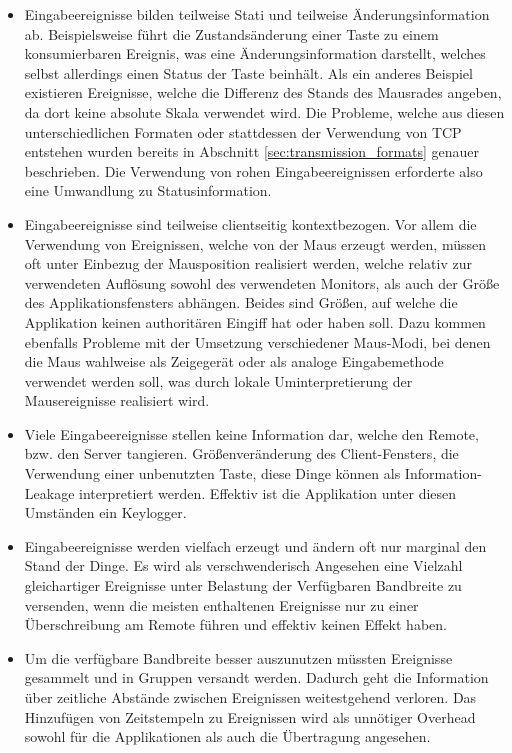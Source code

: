 \begin{itemize}
\item Eingabeereignisse bilden teilweise Stati und teilweise Änderungsinformation ab. Beispielsweise führt die Zustandsänderung einer Taste zu einem konsumierbaren Ereignis, was eine Änderungsinformation darstellt, welches selbst allerdings einen Status der Taste beinhält. Als ein anderes Beispiel existieren Ereignisse, welche die Differenz des Stands des Mausrades angeben, da dort keine absolute Skala verwendet wird. Die Probleme, welche aus diesen unterschiedlichen Formaten oder stattdessen der Verwendung von TCP entstehen wurden bereits in Abschnitt \ref{sec:transmission_formats} genauer beschrieben. Die Verwendung von rohen Eingabeereignissen erforderte also eine Umwandlung zu Statusinformation.
\item Eingabeereignisse sind teilweise clientseitig kontextbezogen. Vor allem die Verwendung von Ereignissen, welche von der Maus erzeugt werden, müssen oft unter Einbezug der Mausposition realisiert werden, welche relativ zur verwendeten Auflösung sowohl des verwendeten Monitors, als auch der Größe des Applikationsfensters abhängen. Beides sind Größen, auf welche die Applikation keinen authoritären Eingiff hat oder haben soll. Dazu kommen ebenfalls Probleme mit der Umsetzung verschiedener Maus-Modi, bei denen die Maus wahlweise als Zeigegerät oder als analoge Eingabemethode verwendet werden soll, was durch lokale Uminterpretierung der Mausereignisse realisiert wird.
\item Viele Eingabeereignisse stellen keine Information dar, welche den Remote, bzw. den Server tangieren. Größenveränderung des Client-Fensters, die Verwendung einer unbenutzten Taste, diese Dinge können als Information-Leakage interpretiert werden. Effektiv ist die Applikation unter diesen Umständen ein Keylogger.
\item Eingabeereignisse werden vielfach erzeugt und ändern oft nur marginal den Stand der Dinge. Es wird als verschwenderisch Angesehen eine Vielzahl gleichartiger Ereignisse unter Belastung der Verfügbaren Bandbreite zu versenden, wenn die meisten enthaltenen Ereignisse nur zu einer Überschreibung am Remote führen und effektiv keinen Effekt haben.
\item Um die verfügbare Bandbreite besser auszunutzen müssten Ereignisse gesammelt und in Gruppen versandt werden. Dadurch geht die Information über zeitliche Abstände zwischen Ereignissen weitestgehend verloren. Das Hinzufügen von Zeitstempeln zu Ereignissen wird als unnötiger Overhead sowohl für die Applikationen als auch die Übertragung angesehen.
\end{itemize}

